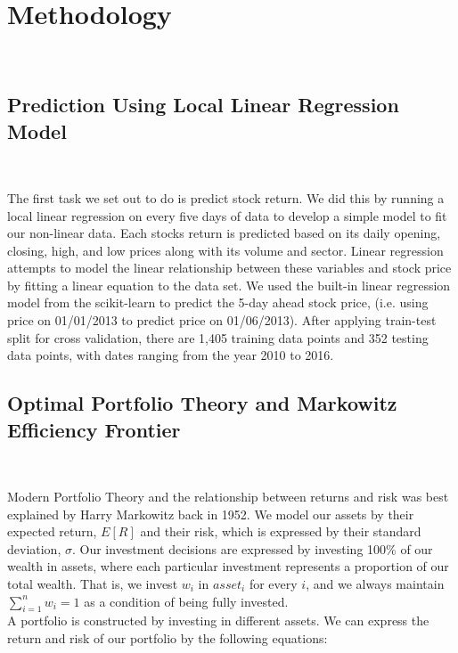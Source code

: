 \documentclass[11pt, oneside]{article}   	%
\begin{document}
\FloatBarrier

\clearpage



\section{Methodology} \

\subsection{Prediction Using Local Linear Regression Model} \

The first task we set out to do is predict stock return. We did this by running a local linear regression on every five days of data to develop a simple model to fit our non-linear data. Each stocks return is predicted based on its daily opening, closing, high, and low prices along with its volume and sector. Linear regression attempts to model the linear relationship between these variables and stock price by fitting a linear equation to the data set. We used the built-in linear regression model from the scikit-learn to predict the 5-day ahead stock price, (i.e. using price on 01/01/2013 to predict price on 01/06/2013). After applying train-test split for cross validation, there are 1,405 training data points and 352 testing data points, with dates ranging from the year 2010 to 2016.

\subsection{Optimal Portfolio Theory and Markowitz Efficiency Frontier} \

Modern Portfolio Theory and the relationship between returns and risk was best explained by Harry Markowitz back in 1952. We model our assets by their expected return, $E[R]$ and their risk, which is expressed by their standard deviation, $\sigma$. Our investment decisions are expressed by investing 100\% of our wealth in assets, where each particular investment represents a proportion of our total wealth. That is, we invest $w_i$ in $asset_i$ for every $i$, and we always maintain $\sum_{i=1}^{n}w_i=1$ as a condition of being fully invested.\\  
  
A portfolio is constructed by investing in different assets. We can express the return and risk of our portfolio by the following equations: \\
\end{document}
